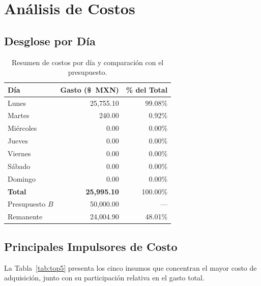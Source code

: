 \documentclass[12pt]{report}
\begin{document}
\section{Análisis de Costos}

\subsection{Desglose por Día}

\begin{table}[H]
\centering
\renewcommand{\arraystretch}{1.3}
\begin{tabular}{lrr}
\toprule
\textbf{Día} & \textbf{Gasto (\$~MXN)} & \textbf{\% del Total} \\
\midrule
Lunes      & 25{,}755.10 & 99.08\% \\
Martes     &     240.00  &  0.92\% \\
Miércoles  &       0.00  &  0.00\% \\
Jueves     &       0.00  &  0.00\% \\
Viernes    &       0.00  &  0.00\% \\
Sábado     &       0.00  &  0.00\% \\
Domingo    &       0.00  &  0.00\% \\
\midrule
\textbf{Total}        & \textbf{25{,}995.10} & 100.00\% \\
Presupuesto $B$       & 50{,}000.00 & --- \\
Remanente             & 24{,}004.90 & 48.01\% \\
\bottomrule
\end{tabular}
\caption{Resumen de costos por día y comparación con el presupuesto.}
\label{tab:costos_dia}
\end{table}

\subsection{Principales Impulsores de Costo}

La Tabla~\ref{tab:top5} presenta los cinco insumos que concentran el mayor costo
de adquisición, junto con su participación relativa en el gasto total.
\end{document}

